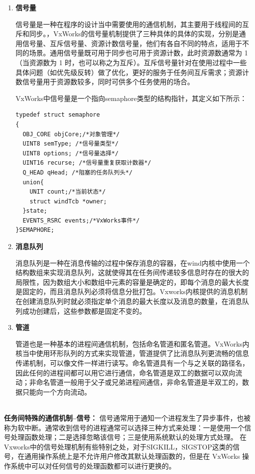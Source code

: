 \begin{enumerate}
	\item \textbf{信号量}
	
	信号量是一种在程序的设计当中需要使用的通信机制，其主要用于线程间的互斥和同步。，VxWorks的信号量机制提供了三种具体的具体的实现，分别是通用信号量、互斥信号量、资源计数信号量，他们有各自不同的特点，适用于不同的场景。通用信号量既可用于同步也可用于资源计数，此时资源数通常为 1（当资源数为 1 时，也可以称之为互斥）。互斥信号量针对在使用过程中一些具体问题（如优先级反转）做了优化，更好的服务于任务间互斥需求；资源计数信号量用于资源数较多，同时可供多个任务使用的场合\cite{冯云贺2014基于}。
	
	VxWorks中信号量是一个指向semaphore类型的结构指针，其定义如下所示\cite{胡明民2012基于实时操作系统}：
\lstset{language=C}
\begin{lstlisting}
typedef struct semaphore
{
  OBJ_CORE objCore;/*对象管理*/
  UINT8 semType; /*信号量类型*/
  UINT8 options; /*信号量选择*/
  UINT16 recurse; /*信号量重复获取计数器*/
  Q_HEAD qHead; /*阻塞的任务队列头*/
  union{
	UNIT count;/*当前状态*/
	struct windTcb *owner;  
  }state;
  EVENTS_RSRC events;/*VxWorks事件*/
}SEMAPHORE;
\end{lstlisting}
	
	\item \textbf{消息队列}
	
	消息队列是一种在消息传输的过程中保存消息的容器，在wind内核中使用一个结构数组来实现消息队列，这就使得其在任务间传递较多信息时存在的很大的局限性，因为数组大小和数组中元素的容量是确定的，即每个消息的最大长度是固定的，而且消息队列必须将信息分批打包。Vxworks内核提供的消息机制在创建消息队列时就必须指定单个消息的最大长度以及消息的数量，在消息队列成功创建后，这些参数都是固定不变的\cite{冯云贺2014基于}。
	
	\item \textbf{管道}
	
	管道也是一种基本的进程间通信机制，包括命名管道和匿名管道。VxWorks内核当中使用环形队列的方式来实现管道，管道提供了比消息队列更流畅的信息传递机制，可以像文件一样进行读写。命名管道具有一个与之关联的路径名，因此任何的进程间都可以用它进行通信，命名管道是双工的数据可以双向流动；非命名管道一般用于父子或兄弟进程间通信，非命名管道是半双工的，数据只能向一个方向流动。
\end{enumerate}\\		
\textbf{任务间特殊的通信机制--信号：} 信号通常用于通知一个进程发生了异步事件，也被称为软中断。通常收到信号的进程通常可以选择三种方式来处理：一是使用一个信号处理函数处理；二是选择忽略该信号；三是使用系统默认的处理方式处理。
在Vxworks中的信号处理机制有些特别之处，对于SIGKILL，SIGSTOP这类的信号，在通用操作系统上是不允许用户修改其默认处理函数的，但是在 VxWorks 操作系统中可以对任何信号的处理函数都可以进行更换的。



